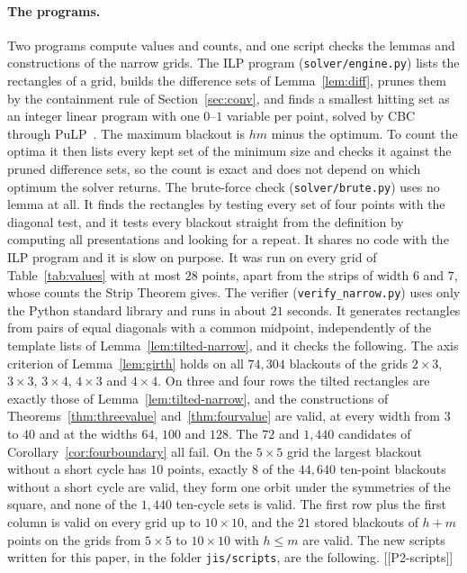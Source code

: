 \paragraph{The programs.} Two programs compute values and counts, and one script checks the
lemmas and constructions of the narrow grids. The ILP program (\texttt{solver/engine.py})
lists the rectangles of a grid, builds the difference sets of Lemma~\ref{lem:diff}, prunes them
by the containment rule of Section~\ref{sec:conv}, and finds a smallest hitting set as an
integer linear program with one $0$--$1$ variable per point, solved by CBC through
PuLP~\cite{pulp}. The maximum blackout is $hm$ minus the optimum. To count the optima it then
lists every kept set of the minimum size and checks it against the pruned difference sets, so
the count is exact and does not depend on which optimum the solver returns. The brute-force
check (\texttt{solver/brute.py}) uses no lemma at all. It finds the rectangles by testing every
set of four points with the diagonal test, and it tests every blackout straight from the
definition by computing all presentations and looking for a repeat. It shares no code with the
ILP program and it is slow on purpose. It was run on every grid of Table~\ref{tab:values}
with at most $28$ points, apart from the strips of width $6$ and $7$, whose counts the Strip
Theorem gives. The verifier (\texttt{verify\_narrow.py}) uses only the Python
standard library and runs in about $21$ seconds. It generates rectangles from pairs of equal
diagonals with a common midpoint, independently of the template lists of
Lemma~\ref{lem:tilted-narrow}, and it checks the following. The axis criterion of
Lemma~\ref{lem:girth} holds on all $74{,}304$ blackouts of the grids $2\times3$, $3\times3$,
$3\times4$, $4\times3$ and $4\times4$. On three and four rows the tilted rectangles are exactly
those of Lemma~\ref{lem:tilted-narrow}, and the constructions of Theorems~\ref{thm:threevalue}
and~\ref{thm:fourvalue} are valid, at every width from $3$ to $40$ and at the widths $64$, $100$
and $128$. The $72$ and $1{,}440$ candidates of Corollary~\ref{cor:fourboundary} all fail. On the
$5\times5$ grid the largest blackout without a short cycle has $10$ points, exactly $8$ of the
$44{,}640$ ten-point blackouts without a short cycle are valid, they form one orbit under the
symmetries of the square, and none of the $1{,}440$ ten-cycle sets is valid. The first row plus
the first column is valid on every grid up to $10\times10$, and the $21$ stored blackouts of
$h+m$ points on the grids from $5\times5$ to $10\times10$ with $h\le m$ are valid. The new
scripts written for this paper, in the folder \texttt{jis/scripts}, are the following.
[[P2-scripts]]

